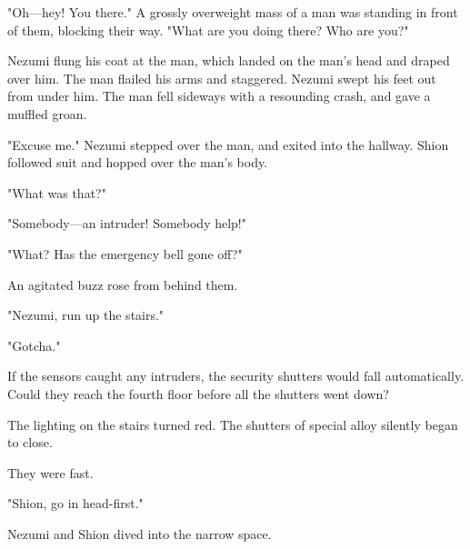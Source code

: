 "Oh---hey! You there." A grossly overweight mass of a man was standing in
front of them, blocking their way. "What are you doing there? Who are
you?"

Nezumi flung his coat at the man, which landed on the man's head and
draped over him. The man flailed his arms and staggered. Nezumi swept
his feet out from under him. The man fell sideways with a resounding
crash, and gave a muffled groan.

"Excuse me." Nezumi stepped over the man, and exited into the hallway.
Shion followed suit and hopped over the man's body.

"What was that?"

"Somebody---an intruder! Somebody help!"

"What? Has the emergency bell gone off?"

An agitated buzz rose from behind them.

"Nezumi, run up the stairs."

"Gotcha."

If the sensors caught any intruders, the security shutters would fall
automatically. Could they reach the fourth floor before all the shutters
went down?

The lighting on the stairs turned red. The shutters of special alloy
silently began to close.

They were fast.

"Shion, go in head-first."

Nezumi and Shion dived into the narrow space.